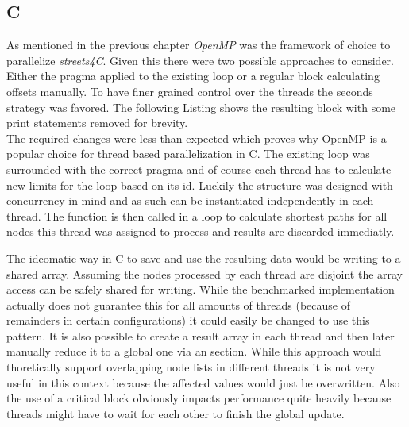 \subsection{C}
\label{subsec:Implementation::ParallelBenchmark::C}

As mentioned in the previous chapter \textit{OpenMP} was the framework of choice to parallelize \textit{streets4C}. Given this there were two possible approaches to consider. Either the  pragma applied to the existing loop or a regular  block calculating offsets manually. To have finer grained control over the threads the seconds strategy was favored. The following \hyperref[lst:openmp.c]{Listing} shows the resulting  block with some print statements removed for brevity.
\\


The required changes were less than expected which proves why OpenMP is a popular choice for thread based parallelization in C. The existing loop was surrounded with the correct pragma and of course each thread has to calculate new limits for the loop based on its id. Luckily the  structure was designed with concurrency in mind and as such can be instantiated independently in each thread. The  function is then called in a loop to calculate shortest paths for all nodes this thread was assigned to process and results are discarded immediatly.

The ideomatic way in C to save and use the resulting data would be writing to a shared array. Assuming the nodes processed by each thread are disjoint the array access can be safely shared for writing. While the benchmarked implementation actually does not guarantee this for all amounts of threads (because of remainders in certain configurations) it could easily be changed to use this pattern. It is also possible to create a result array in each thread and then later manually reduce it to a global one via an  section. While this approach would thoretically support overlapping node lists in different threads it is not very useful in this context because the affected values would just be overwritten. Also the use of a critical block obviously impacts performance quite heavily because threads might have to wait for each other to finish the global update.

